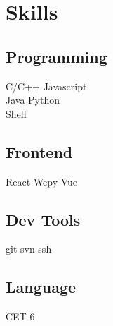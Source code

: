 \documentclass[]{deedy-resume-openfont}
\begin{document}
\begin{minipage}[t]{0.3\textwidth}

\section{Skills}
\sectionsep
\subsection{\textbf{Programming}}
C/C++ \textbullet{} Javascript\\
Java \textbullet{} Python \ \\
Shell  \\ 
\sectionsep

\subsection{\textbf{Frontend}}
React \textbullet{} Wepy \textbullet{} Vue \\


\subsection{Dev Tools}
git \textbullet svn \textbullet ssh \\
\sectionsep

\subsection{Language}
CET 6   \\
\sectionsep

%
%

\end{minipage} 
\hfill
\end{document}
